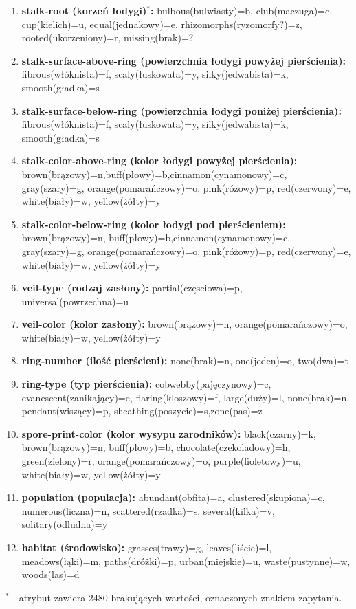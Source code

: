 \documentclass[10pt,a4paper]{article}
\begin{document}
\begin{flushleft}
\begin{enumerate}
		\item \textbf{stalk-root (korzeń łodygi)$^*$:} bulbous(bulwiasty)=b, club(maczuga)=c, cup(kielich)=u, equal(jednakowy)=e, rhizomorphs(ryzomorfy?)=z, rooted(ukorzeniony)=r, missing(brak)=?
		\item \textbf{stalk-surface-above-ring (powierzchnia łodygi powyżej pierścienia):} fibrous(włóknista)=f, scaly(łuskowata)=y, silky(jedwabista)=k, smooth(gładka)=s
		\item \textbf{stalk-surface-below-ring (powierzchnia łodygi poniżej pierścienia):} fibrous(włóknista)=f, scaly(łuskowata)=y, silky(jedwabista)=k, smooth(gładka)=s
		\item \textbf{stalk-color-above-ring (kolor łodygi powyżej pierścienia):} brown(brązowy)=n,buff(płowy)=b,cinnamon(cynamonowy)=c, gray(szary)=g, orange(pomarańczowy)=o, pink(różowy)=p, red(czerwony)=e, white(biały)=w, yellow(żółty)=y
		\item \textbf{stalk-color-below-ring (kolor łodygi pod pierścieniem):} brown(brązowy)=n, buff(płowy)=b,cinnamon(cynamonowy)=c, gray(szary)=g, orange(pomarańczowy)=o, pink(różowy)=p, red(czerwony)=e, white(biały)=w, yellow(żółty)=y
		\item \textbf{veil-type (rodzaj zasłony):} partial(częsciowa)=p, universal(powrzechna)=u
		\item \textbf{veil-color (kolor zasłony):} brown(brązowy)=n, orange(pomarańczowy)=o, white(biały)=w, yellow(żółty)=y
		\item \textbf{ring-number (ilość pierścieni):} none(brak)=n, one(jeden)=o, two(dwa)=t
		\item \textbf{ring-type (typ pierścienia):} cobwebby(pajęczynowy)=c, evanescent(zanikający)=e, flaring(kloszowy)=f, large(duży)=l, none(brak)=n, pendant(wiszący)=p, sheathing(poszycie)=s,zone(pas)=z
		\item \textbf{spore-print-color (kolor wysypu zarodników):} black(czarny)=k, brown(brązowy)=n, buff(płowy)=b, chocolate(czekoladowy)=h, green(zielony)=r, orange(pomarańczowy)=o, purple(fioletowy)=u, white(biały)=w, yellow(żółty)=y
		\item \textbf{population (populacja):} abundant(obfita)=a, clustered(skupiona)=c, numerous(liczna)=n, scattered(rzadka)=s, several(kilka)=v, solitary(odludna)=y
		\item \textbf{habitat (środowisko):} grasses(trawy)=g, leaves(liście)=l, meadows(łąki)=m, paths(dróżki)=p, urban(miejskie)=u, waste(pustynne)=w, woods(las)=d 
	\end{enumerate}
\end{flushleft}
$^*$ - atrybut zawiera 2480 brakujących wartości, oznaczonych znakiem zapytania.
\vskip 0.2in
\end{document}
